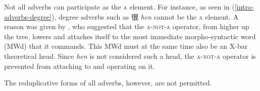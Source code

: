 \documentclass[12pt, UTF8]{article}
\begin{document}
Not all adverbs can participate as the \textsc{a} element. For instance, as seen in (\ref{intro-adverbs-degree}), degree adverbs such as 很 \textit{hen} cannot be the \textsc{a} element. A reason was given by \cite{Tseng2009}, who suggested that the \textsc{a-not-a} operator, from higher up the tree, lowers and attaches itself to the most immediate morpho-syntactic word (MWd) that it commands. This MWd must at the same time also be an X-bar theoretical head. Since \textit{hen} is not considered such a head, the \textsc{a-not-a} operator is prevented from attaching to and operating on it.

The reduplicative forms of all adverbs, however, are not permitted.








\end{document}
